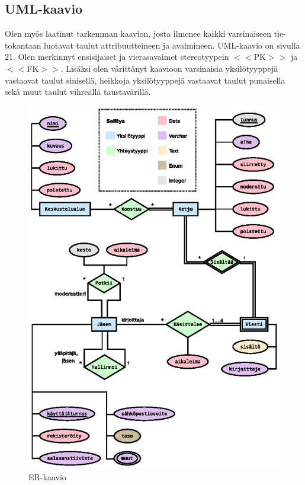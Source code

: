 \documentclass[11pt]{article}
\begin{document}
		\subsection{UML-kaavio} Olen myös laatinut tarkemman kaavion, josta ilmenee kaikki varsinaiseen
		tie-tokantaan luotavat taulut attribuutteineen ja avaimineen. UML-kaavio on sivulla 21. Olen merkinnyt
		ensisijaiset ja vierasavaimet stereotyypein $<<$PK$>>$ ja $<<$FK$>>$. Lisäksi olen värittänyt
		kaavioon varsinaisia yksilötyyppejä vastaavat taulut sinisellä, heikkoja yksilötyyppejä vastaavat
		taulut punaisella sekä muut taulut vihreällä taustavärillä.
		
		\newpage
		\thispagestyle{plain}
		\begin{figure}[H]		
			\includegraphics[trim = 6mm 0mm 0mm 20mm, scale = 1.5]{er-kaavio.eps}
			\caption{ER-kaavio}
		\end{figure}
		
\end{document}
